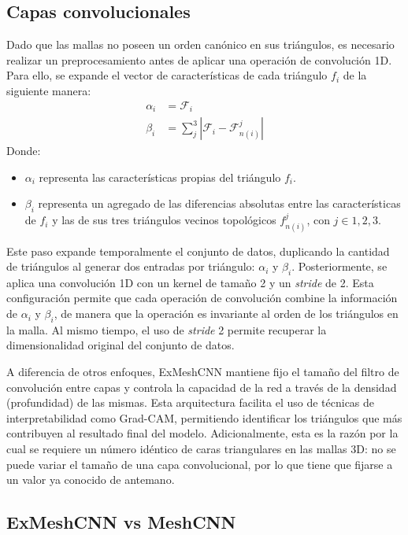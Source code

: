 \FloatBarrier
\subsection{Capas convolucionales}
Dado que las mallas no poseen un orden canónico en sus triángulos, es necesario realizar un preprocesamiento antes de aplicar una operación de convolución 1D. Para ello, se expande el vector de características de cada triángulo $f_i$ de la siguiente manera:
\begin{align}
    \alpha_i &= \mathcal{F}_{i} \\
    \beta_i &= \sum_{j}^{3} | \mathcal{F}_{i} - \mathcal{F}_{n(i)}^{j}| 
\end{align}
Donde:
\begin{itemize}
    \item $\alpha_i$ representa las características propias del triángulo $f_i$.
    \item $\beta_i$ representa un agregado de las diferencias absolutas entre las características de $f_i$ y las de sus tres triángulos vecinos topológicos $f_{n(i)}^{j}$, con $j \in {1, 2, 3}$.
\end{itemize}

Este paso expande temporalmente el conjunto de datos, duplicando la cantidad de triángulos al generar dos entradas por triángulo: $\alpha_i$ y $\beta_i$. Posteriormente, se aplica una convolución 1D con un kernel de tamaño 2 y un \textit{stride} de 2. Esta configuración permite que cada operación de convolución combine la información de $\alpha_i$ y $\beta_i$, de manera que la operación es invariante al orden de los triángulos en la malla. Al mismo tiempo, el uso de \textit{stride} 2 permite recuperar la dimensionalidad original del conjunto de datos.

A diferencia de otros enfoques, ExMeshCNN mantiene fijo el tamaño del filtro de convolución entre capas y controla la capacidad de la red a través de la densidad (profundidad) de las mismas. Esta arquitectura facilita el uso de técnicas de interpretabilidad como Grad-CAM, permitiendo identificar los triángulos que más contribuyen al resultado final del modelo. Adicionalmente, esta es la razón por la cual se requiere un número idéntico de caras triangulares en las mallas 3D: no se puede variar el tamaño de una capa convolucional, por lo que tiene que fijarse a un valor ya conocido de antemano.

\subsection{ExMeshCNN vs MeshCNN}

